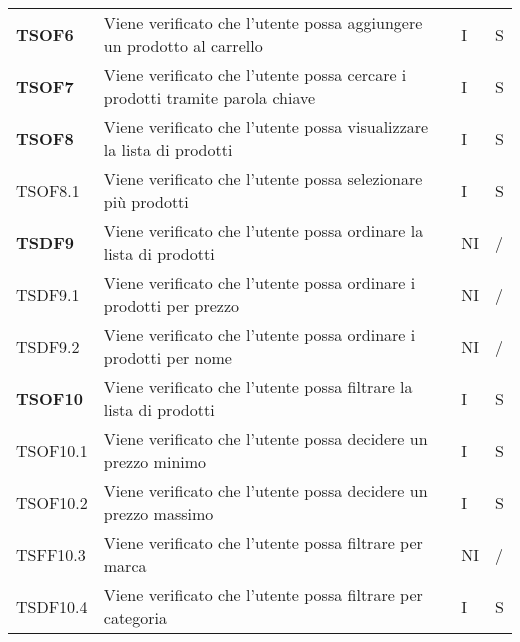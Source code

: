 \begin{center}
\begin{longtable}[!h]{p{60px} p{240px} p{35px} p{35px}}
        \textbf{TSOF6}  & Viene verificato che l'utente possa aggiungere un prodotto al carrello                                               & I              & S              \\
        \textbf{TSOF7}  & Viene verificato che l'utente possa cercare i prodotti tramite parola chiave                                         & I              & S              \\
        \textbf{TSOF8}  & Viene verificato che l'utente possa visualizzare la lista di prodotti                                                & I              & S              \\
        TSOF8.1         & Viene verificato che l'utente possa selezionare più prodotti                                                         & I              & S              \\
        \textbf{TSDF9}  & Viene verificato che l'utente possa ordinare la lista di prodotti                                                    & NI             & /              \\
        TSDF9.1         & Viene verificato che l'utente possa ordinare i prodotti per prezzo                                                   & NI             & /              \\
        TSDF9.2         & Viene verificato che l'utente possa ordinare i prodotti per nome                                                     & NI             & /              \\
        \textbf{TSOF10} & Viene verificato che l'utente possa filtrare la lista di prodotti                                                    & I              & S              \\
        TSOF10.1        & Viene verificato che l'utente possa decidere un prezzo minimo                                                        & I              & S              \\
        TSOF10.2        & Viene verificato che l'utente possa decidere un prezzo massimo                                                       & I              & S              \\
        TSFF10.3        & Viene verificato che l'utente possa filtrare per marca                                                               & NI             & /              \\
        TSDF10.4        & Viene verificato che l'utente possa filtrare per categoria                                                           & I              & S              \\

\end{longtable}
\end{center}
